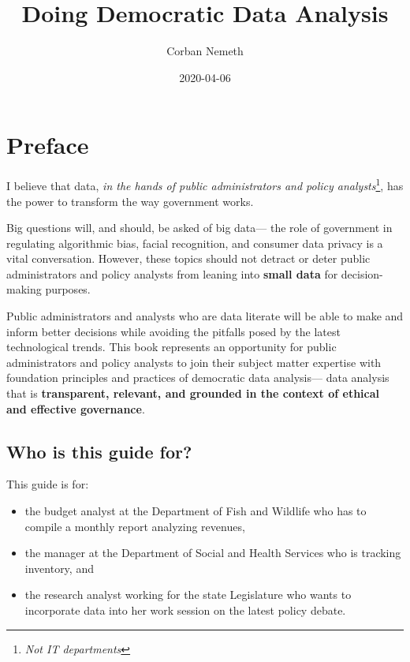 \documentclass[]{book}
\title{Doing Democratic Data Analysis}
\author{Corban Nemeth}
\date{2020-04-06}
\providecommand{\tightlist}{%
  \setlength{\itemsep}{0pt}\setlength{\parskip}{0pt}}
\begin{document}
\maketitle

{
\setcounter{tocdepth}{1}
\tableofcontents
}
\chapter*{Preface}\label{preface}

I believe that data, \emph{in the hands of public administrators and
policy analysts}\footnote{\emph{Not IT departments}}, has the power to
transform the way government works.

Big questions will, and should, be asked of big data--- the role of
government in regulating algorithmic bias, facial recognition, and
consumer data privacy is a vital conversation. However, these topics
should not detract or deter public administrators and policy analysts
from leaning into \textbf{small data} for decision-making purposes.

Public administrators and analysts who are data literate will be able to
make and inform better decisions while avoiding the pitfalls posed by
the latest technological trends. This book represents an opportunity for
public administrators and policy analysts to join their subject matter
expertise with foundation principles and practices of democratic data
analysis--- data analysis that is \textbf{transparent, relevant, and
grounded in the context of ethical and effective governance}.

\section*{Who is this guide for?}\label{who-is-this-guide-for}

This guide is for:

\begin{itemize}
\tightlist
\item
  the budget analyst at the Department of Fish and Wildlife who has to
  compile a monthly report analyzing revenues,
\item
  the manager at the Department of Social and Health Services who is
  tracking inventory, and
\item
  the research analyst working for the state Legislature who wants to
  incorporate data into her work session on the latest policy debate.
\end{itemize}
\end{document}
